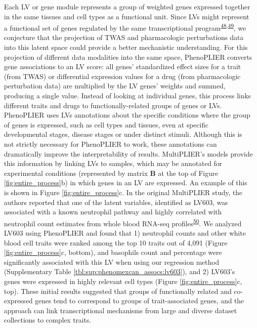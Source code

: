 \documentclass[
  a4paper,
]{article}
\begin{document}
Each LV or gene module represents a group of weighted genes expressed together in the same tissues and cell types as a functional unit.
Since LVs might represent a functional set of genes regulated by the same transcriptional program\textsuperscript{\protect\hyperlink{ref-1FVd2WW6G}{48},\protect\hyperlink{ref-DN7TyZzb}{49}}, we conjecture that the projection of TWAS and pharmacologic perturbations data into this latent space could provide a better mechanistic understanding.
For this projection of different data modalities into the same space, PhenoPLIER converts gene associations to an LV score: all genes' standardized effect sizes for a trait (from TWAS) or differential expression values for a drug (from pharmacologic perturbation data) are multiplied by the LV genes' weights and summed, producing a single value.
Instead of looking at individual genes, this process links different traits and drugs to functionally-related groups of genes or LVs.
PhenoPLIER uses LVs annotations about the specific conditions where the group of genes is expressed, such as cell types and tissues, even at specific developmental stages, disease stages or under distinct stimuli.
Although this is not strictly necessary for PhenoPLIER to work, these annotations can dramatically improve the interpretability of results.
MultiPLIER's models provide this information by linking LVs to samples, which may be annotated for experimental conditions (represented by matrix \(\mathbf{B}\) at the top of Figure \ref{fig:entire_process}b) in which genes in an LV are expressed.
An example of this is shown in Figure \ref{fig:entire_process}c.
In the original MultiPLIER study, the authors reported that one of the latent variables, identified as LV603, was associated with a known neutrophil pathway and highly correlated with neutrophil count estimates from whole blood RNA-seq profiles\textsuperscript{\protect\hyperlink{ref-18TSqd1tG}{50}}.
We analyzed LV603 using PhenoPLIER and found that
1) neutrophil counts and other white blood cell traits were ranked among the top 10 traits out of 4,091 (Figure \ref{fig:entire_process}c, bottom), and basophils count and percentage were significantly associated with this LV when using our regression method (Supplementary Table \ref{tbl:sup:phenomexcan_assocs:lv603}),
and 2) LV603's genes were expressed in highly relevant cell types (Figure \ref{fig:entire_process}c, top).
These initial results suggested that groups of functionally related and co-expressed genes tend to correspond to groups of trait-associated genes, and the approach can link transcriptional mechanisms from large and diverse dataset collections to complex traits.
\end{document}
